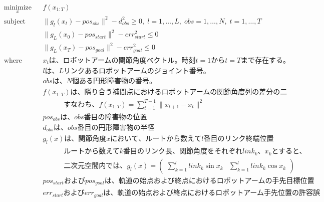 \begin{equation*}
  \begin{aligned}
    & \underset{x}{\text{minimize}}
    & & f(x_{1:T}) \\
    & \text{subject to}
    & & \|g_{l}(x_t) - pos_{obs}\|^2 - d_{obs}^2 \geq 0, \; l = 1, \ldots, L, \; obs = 1, \ldots, N, \; t = 1, \ldots, T \\
    & \text{}
    & & \|g_L(x_0) - pos_{start}\|^2 - err_{start}^2 \leq 0 \\
    & \text{}
    & & \|g_L(x_T) - pos_{goal}\|^2 - err_{goal}^2 \leq 0 \\
    & \text{where}
    & & x_t\text{は、ロボットアームの関節角度ベクトル。時刻}t=1\text{から}t=T\text{まで存在する。} \\
    & \text{}
    & & l\text{は、}L\text{リンクあるロボットアームのジョイント番号。} \\
    & \text{}
    & & obs\text{は、}N\text{個ある円形障害物の番号。} \\
    & \text{}
    & & f(x_{1:T})\text{は、隣り合う補間点におけるロボットアームの関節角度列の差分の二乗和} \\
    & \text{}
    & & \text{　　　すなわち、}f(x_{1:T}) = \sum_{t=1}^{T-1} \|x_{t+1} - x_t\|^2 \\
    & \text{}
    & & pos_{obs}\text{は、}obs\text{番目の障害物の位置} \\
    & \text{}
    & & d_{obs}\text{は、}obs\text{番目の円形障害物の半径} \\
    & \text{}
    & & g_{l}(x)\text{は、関節角度}x{において、ルートから数えて}l\text{番目のリンク終端位置}\\
    & \text{}
    & & \text{　　　ルートから数えて}k\text{番目のリンク長、関節角度をそれぞれ}link_k\text{、}x_k\text{とすると、}\\
    & \text{}
    & & \text{　　　二次元空間内では、}g_l(x) = \left( \begin{array}{cc} \sum_{k=1}^{l} link_k\sin{x_k} & \sum_{k=1}^{l} link_k\cos{x_k} \end{array} \right)\\
    & \text{}
    & & pos_{start}\text{および}pos_{goal}\text{は、軌道の始点および終点におけるロボットアームの手先目標位置} \\
    & \text{}
    & & err_{start}\text{および}err_{goal}\text{は、軌道の始点および終点におけるロボットアーム手先位置の許容誤差}
  \end{aligned}
\end{equation*}

